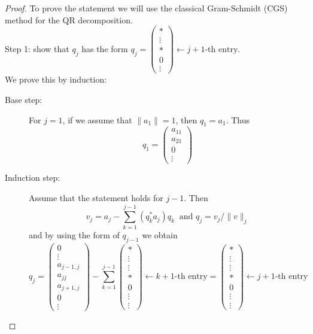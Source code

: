 \documentclass{article}
\numberwithin{pic}{section}
\numberwithin{lem}{section}
\numberwithin{thm}{section}
\numberwithin{cor}{section}
\theoremstyle{definition}
\numberwithin{ex}{section}
\numberwithin{defn}{section}
\theoremstyle{definition}
\theoremstyle{remark}
\begin{document}
\begin{proof}
To prove the statement we will use the classical Gram-Schmidt (CGS) method for the QR decomposition.\\ 
Step 1: show that $q_j$ has the form $q_j=\begin{pmatrix}
* \\ 
\vdots \\ 
* \\ 
0 \\ 
\vdots
\end{pmatrix} \leftarrow j+1\text{-th entry}$.\\
We prove this by induction:
\begin{description}
\item[Base step:] For $j=1$, if we assume that $\|a_1\|=1$, then $q_1=a_1$. Thus
\[q_1= \begin{pmatrix}
a_{11} \\ 
a_{21} \\ 
0 \\  
\vdots
\end{pmatrix}\]
\item[Induction step:] Assume that the statement holds for $j-1$. Then
\[v_j=a_j-\sum_{k=1}^{j-1} (q_k^* a_j)q_k~\text{ and } q_j= v_j/\|v\|_j\]
and by using the form of $q_{j-1}$ we obtain
\[q_j= \begin{pmatrix}
0\\ 
\vdots \\ 
a_{j-1, j} \\ 
a_{jj} \\ 
a_{j+1,j} \\
0\\
\vdots
\end{pmatrix}-\sum_{k=1}^{j-1} \begin{pmatrix}
*\\ 
\vdots \\ 
\vdots \\ 
* \\ 
0 \\
\vdots\\
\vdots
\end{pmatrix}\leftarrow k+1\text{-th entry}= \begin{pmatrix}
*\\ 
\vdots \\ 
\vdots \\ 
* \\ 
0 \\
\vdots\\
\vdots
\end{pmatrix}\leftarrow j+1\text{-th entry} \]

\end{description}
\end{proof}
\end{document}
